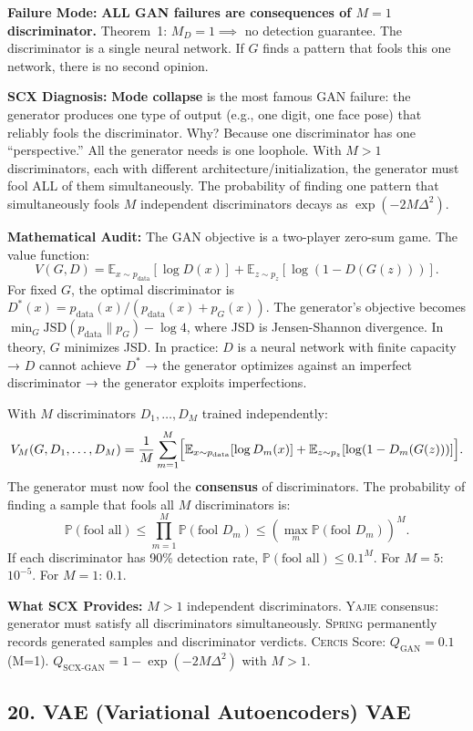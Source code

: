 \documentclass[12pt,a4paper]{article}
\theoremstyle{definition}
\newcommand{\Yajie}{\textsc{Yajie}}
\newcommand{\Spring}{\textsc{Spring}}
\newcommand{\Cercis}{\textsc{Cercis}}
\newcommand{\E}{\mathbb{E}}
\newcommand{\Pbb}{\mathbb{P}}
\newcommand{\whyFail}{\noindent\textbf{Failure Mode:} }
\newcommand{\whatMissing}{\noindent\textbf{What SCX Provides:} }
\newcommand{\diagnosis}{\noindent\textbf{SCX Diagnosis:} }
\newcommand{\mathAudit}{\noindent\textbf{Mathematical Audit:} }
\begin{document}
\whyFail{} \textbf{ALL GAN failures are consequences of $M=1$ discriminator.} Theorem~1: $M_D = 1 \implies$ no detection guarantee. The discriminator is a single neural network. If $G$ finds a pattern that fools this one network, there is no second opinion.

\diagnosis{} \textbf{Mode collapse} is the most famous GAN failure: the generator produces one type of output (e.g., one digit, one face pose) that reliably fools the discriminator. Why? Because one discriminator has one ``perspective.'' All the generator needs is one loophole. With $M>1$ discriminators, each with different architecture/initialization, the generator must fool ALL of them simultaneously. The probability of finding one pattern that simultaneously fools $M$ independent discriminators decays as $\exp(-2M\Delta^2)$.

\mathAudit{} The GAN objective is a two-player zero-sum game. The value function:
\[
V(G, D) = \E_{x \sim p_{\text{data}}}[\log D(x)] + \E_{z \sim p_z}[\log(1 - D(G(z)))].
\]
For fixed $G$, the optimal discriminator is $D^*(x) = p_{\text{data}}(x) / (p_{\text{data}}(x) + p_G(x))$. The generator's objective becomes $\min_G \text{JSD}(p_{\text{data}} \| p_G) - \log 4$, where JSD is Jensen-Shannon divergence. In theory, $G$ minimizes JSD. In practice: $D$ is a neural network with finite capacity → $D$ cannot achieve $D^*$ → the generator optimizes against an imperfect discriminator → the generator exploits imperfections.

With $M$ discriminators $D_1, \ldots, D_M$ trained independently:
\[
V_M(G, D_1, \ldots, D_M) = \frac{1}{M}\sum_{m=1}^M \Bigl[\E_{x \sim p_{\text{data}}}[\log D_m(x)] + \E_{z \sim p_z}[\log(1 - D_m(G(z)))]\Bigr].
\]
The generator must now fool the \textbf{consensus} of discriminators. The probability of finding a sample that fools all $M$ discriminators is:
\[
\Pbb(\text{fool all}) \le \prod_{m=1}^M \Pbb(\text{fool } D_m) \le (\max_m \Pbb(\text{fool } D_m))^M.
\]
If each discriminator has 90\% detection rate, $\Pbb(\text{fool all}) \le 0.1^M$. For $M=5$: $10^{-5}$. For $M=1$: $0.1$.

\whatMissing{} $M>1$ independent discriminators. \Yajie{} consensus: generator must satisfy all discriminators simultaneously. \Spring{} permanently records generated samples and discriminator verdicts. \Cercis{} Score: $Q_{\text{GAN}} = 0.1$ (M=1). $Q_{\text{SCX-GAN}} = 1 - \exp(-2M\Delta^2)$ with $M>1$.

\subsection{20. VAE (Variational Autoencoders) VAE}
\end{document}
